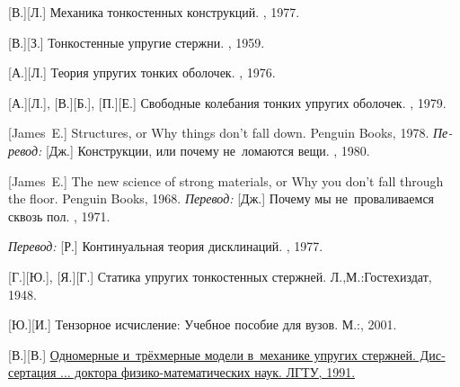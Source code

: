 \begin{thebibliography}{123}
\begin{otherlanguage}{russian}
[В.][Л.]
Механика тонкостенных конструкций.
\maschinenbaumoskauerverlag,
1977.

[В.][З.] Тонкостенные упругие стержни. \fizmatgiz, 1959. 

[А.][Л.] Теория упругих тонких оболочек. \naukapublisher, 1976. 

[А.][Л.], [В.][Б.], [П.][Е.] Свободные ко\-леба\-ния тонких упругих оболочек. \naukapublisher, 1979. 

[James~E.] Structures, or Why things don’t fall down. Penguin Books, 1978. 
\emph{Перевод:}
[Дж.]
Конструкции, или почему не~ломаются вещи.
\mirpublisher,
1980.

[James~E.] The new science of strong materials, or Why you don’t fall through the floor. Penguin Books, 1968. 
\emph{Перевод:}
[Дж.]
Почему мы не~проваливаемся сквозь пол.
\mirpublisher,
1971.


\emph{Перевод:}
[Р.]
Континуальная теория дисклинаций.
\mirpublisher,
1977.

[Г.][Ю.],
[Я.][Г.]
Статика упругих тонкостенных стержней.
Л.,\:М.:\;Гостехиздат, 1948.

[Ю.][И.]
Тензорное исчисление: Учебное пособие для вузов.
М.:\;, 2001.

[В.][В.] \href{https://www.researchgate.net/publication/320895320_Odnomernye_i_trehmernye_modeli_v_mehanike_uprugih_sterznej}{Одномерные и~трёхмерные модели в~механике упругих стержней. Диссертация ... доктора
физико-математических наук.
ЛГТУ, 1991.}


\end{otherlanguage}
\end{thebibliography}
